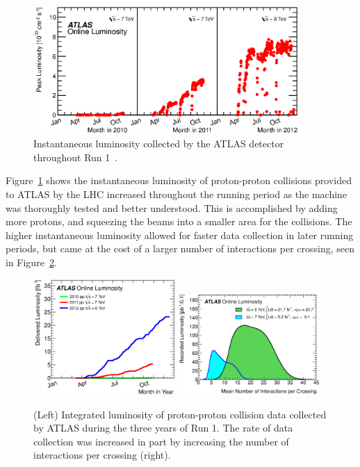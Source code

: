 \begin{figure}
  \centering
  \includegraphics[width=0.9\textwidth]{figs/lhc/lumivstime.eps}
  \caption{
    Instantaneous luminosity collected by the ATLAS detector throughout
    Run 1~\cite{atlas-lumi}.
  }
  \label{fig:inst_lumi_vs_time}
\end{figure}

Figure~\ref{fig:inst_lumi_vs_time} shows the instantaneous luminosity of
proton-proton collisions provided to ATLAS by the LHC increased throughout the
running period as the machine was thoroughly tested and better understood.
This is accomplished by adding more protons, and squeezing the beams into
a smaller area for the collisions.
The higher instantaneous luminosity allowed for faster data collection in later
running periods, but came at the cost of a larger number of interactions per
crossing, seen in Figure~\ref{fig:int_lumi_vs_time_and_pileup}.

\begin{figure}
  \centering
  \includegraphics[width=0.48\textwidth]{figs/lhc/intlumivsyear.eps}
  \includegraphics[width=0.48\textwidth]{figs/lhc/mu_2011_2012-dec.eps}
  \caption{
    (Left) Integrated luminosity of proton-proton collision data collected by
    ATLAS during the three years of Run 1.
    The rate of data collection was increased in part by increasing the number
    of interactions per crossing (right).
  }
  \label{fig:int_lumi_vs_time_and_pileup}
\end{figure}


